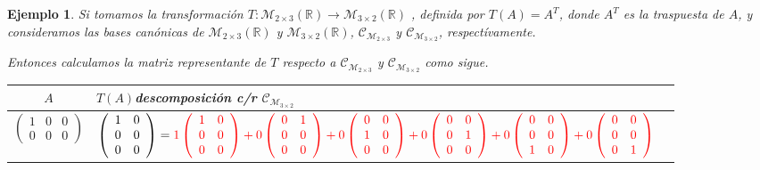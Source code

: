 \documentclass[12pt]{book}
\newtheorem{ejem}{Ejemplo}
\def\R{\mathbb{R}}
\def\M{\mathcal{M}}
\def\Ccal{\mathcal{C}}
\begin{document}
\begin{ejem}
Si tomamos la transformación $T:\M_{2\times 3}(\R)\rightarrow\M_{3\times 2}(\R)$ , definida por $T(A)=A^T$, donde $A^T$ es la traspuesta de $A$, y consideramos las bases canónicas de $\M_{2\times3}(\R)$ y $\M_{3\times2}(\R)$, $\Ccal_{\M_{2\times3}}$ y $\Ccal_{\M_{3\times2}}$, respectívamente.

{\em Entonces calculamos la matriz representante de $T$ respecto a $\Ccal_{\M_{2\times3}}$ y $\Ccal_{\M_{3\times2}}$ como sigue.

{\small
\begin{tabular}{c|ll}
$A$&\hspace{.3cm}$T(A)$\hspace{1.3cm}descomposición c/r $\Ccal_{\M_{3\times2}}$\\\hline
$\left(\begin{array}{ccc} 1&0&0\\0&0&0\end{array}\right)$ & $\left(\begin{array}{cc} 1&0\\0&0\\0&0\end{array}\right)=\color{red}1
\left(\begin{array}{cc} 1&0\\0&0\\0&0\end{array}\right)+0
\left(\begin{array}{cc} 0&1\\0&0\\0&0\end{array}\right)+0
\left(\begin{array}{cc} 0&0\\1&0\\0&0\end{array}\right)+0
\left(\begin{array}{cc} 0&0\\0&1\\0&0\end{array}\right)+0
\left(\begin{array}{cc} 0&0\\0&0\\1&0\end{array}\right)+0
\left(\begin{array}{cc} 0&0\\0&0\\0&1\end{array}\right)$\\\hline

\end{tabular}}}
\end{ejem}
\end{document}
